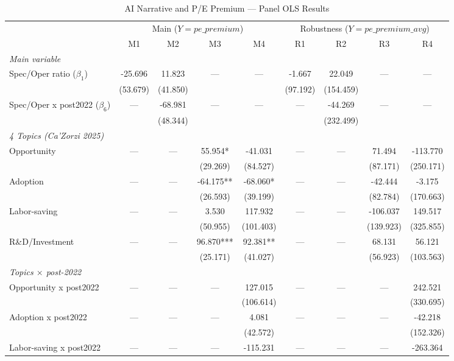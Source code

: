 \begin{table}[htbp]
\centering
\caption{AI Narrative and P/E Premium --- Panel OLS Results}
\label{tab:regression}
\small
\begin{tabular}{lcccc|cccc}
\hline\hline
 & \multicolumn{4}{c|}{Main ($Y=pe\_premium$)} & \multicolumn{4}{c}{Robustness ($Y=pe\_premium\_avg$)} \\
 & M1 & M2 & M3 & M4 & R1 & R2 & R3 & R4 \\
\hline
\multicolumn{9}{l}{\textit{Main variable}}\\
\quad Spec/Oper ratio ($\beta_1$) & -25.696 & 11.823 & --- & --- & -1.667 & 22.049 & --- & --- \\
  & (53.679) & (41.850) &  &  & (97.192) & (154.459) &  &  \\
\quad Spec/Oper x post2022 ($\beta_6$) & --- & -68.981 & --- & --- & --- & -44.269 & --- & --- \\
  &  & (48.344) &  &  &  & (232.499) &  &  \\
\multicolumn{9}{l}{\textit{4 Topics (Ca'Zorzi 2025)}}\\
\quad Opportunity & --- & --- & 55.954* & -41.031 & --- & --- & 71.494 & -113.770 \\
  &  &  & (29.269) & (84.527) &  &  & (87.171) & (250.171) \\
\quad Adoption & --- & --- & -64.175** & -68.060* & --- & --- & -42.444 & -3.175 \\
  &  &  & (26.593) & (39.199) &  &  & (82.784) & (170.663) \\
\quad Labor-saving & --- & --- & 3.530 & 117.932 & --- & --- & -106.037 & 149.517 \\
  &  &  & (50.955) & (101.403) &  &  & (139.923) & (325.855) \\
\quad R\&D/Investment & --- & --- & 96.870*** & 92.381** & --- & --- & 68.131 & 56.121 \\
  &  &  & (25.171) & (41.027) &  &  & (56.923) & (103.563) \\
\multicolumn{9}{l}{\textit{Topics $\times$ post-2022}}\\
\quad Opportunity x post2022 & --- & --- & --- & 127.015 & --- & --- & --- & 242.521 \\
  &  &  &  & (106.614) &  &  &  & (330.695) \\
\quad Adoption x post2022 & --- & --- & --- & 4.081 & --- & --- & --- & -42.218 \\
  &  &  &  & (42.572) &  &  &  & (152.326) \\
\quad Labor-saving x post2022 & --- & --- & --- & -115.231 & --- & --- & --- & -263.364 \\

\end{tabular}
\end{table}
